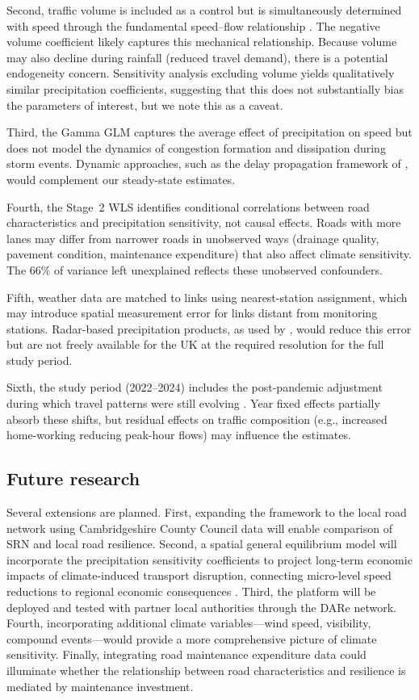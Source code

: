 \documentclass[review]{elsarticle}
\begin{document}
Second, traffic volume is included as a control but is simultaneously determined with speed through the fundamental speed--flow relationship \citep{greenshields1935study}. The negative volume coefficient likely captures this mechanical relationship. Because volume may also decline during rainfall (reduced travel demand), there is a potential endogeneity concern. Sensitivity analysis excluding volume yields qualitatively similar precipitation coefficients, suggesting that this does not substantially bias the parameters of interest, but we note this as a caveat.

Third, the Gamma GLM captures the average effect of precipitation on speed but does not model the dynamics of congestion formation and dissipation during storm events. Dynamic approaches, such as the delay propagation framework of \citet{liu2026extreme}, would complement our steady-state estimates.

Fourth, the Stage~2 WLS identifies conditional correlations between road characteristics and precipitation sensitivity, not causal effects. Roads with more lanes may differ from narrower roads in unobserved ways (drainage quality, pavement condition, maintenance expenditure) that also affect climate sensitivity. The 66\% of variance left unexplained reflects these unobserved confounders.

Fifth, weather data are matched to links using nearest-station assignment, which may introduce spatial measurement error for links distant from monitoring stations. Radar-based precipitation products, as used by \citet{becker2026rainfall}, would reduce this error but are not freely available for the UK at the required resolution for the full study period.

Sixth, the study period (2022--2024) includes the post-pandemic adjustment during which travel patterns were still evolving \citep{wan2024paradox}. Year fixed effects partially absorb these shifts, but residual effects on traffic composition (e.g., increased home-working reducing peak-hour flows) may influence the estimates.

\subsection{Future research}
\label{sec:disc:future}

Several extensions are planned. First, expanding the framework to the local road network using Cambridgeshire County Council data will enable comparison of SRN and local road resilience. Second, a spatial general equilibrium model will incorporate the precipitation sensitivity coefficients to project long-term economic impacts of climate-induced transport disruption, connecting micro-level speed reductions to regional economic consequences \citep{ganin2017resilience}. Third, the platform will be deployed and tested with partner local authorities through the DARe network. Fourth, incorporating additional climate variables---wind speed, visibility, compound events---would provide a more comprehensive picture of climate sensitivity. Finally, integrating road maintenance expenditure data could illuminate whether the relationship between road characteristics and resilience is mediated by maintenance investment.
\end{document}

